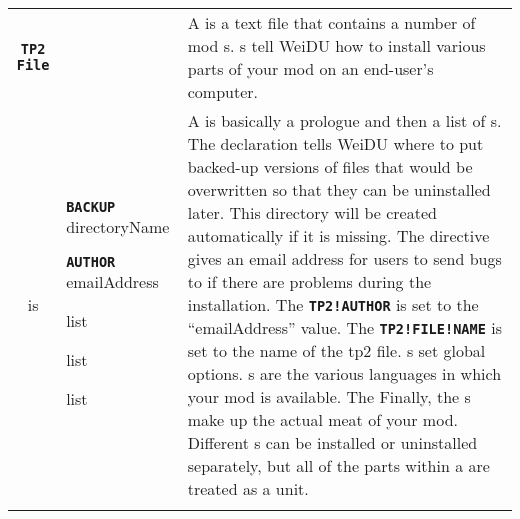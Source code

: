 \documentclass{article}
\def\ttref#1{\ahrefloc{#1}{\tt #1}}
\def\DEFINE#1{{\tt \bf #1}\label{#1}\index{#1}}
\def\Slist{{\color{red} list }}
\begin{document}
\begin{tabular}{cp{10in}|p{10in}}

\DEFINE{TP2 File} & &
  A \ttref{TP2 File} is a text file that contains a number of
  mod \ttref{Component}s. \ttref{TP2 File}s tell WeiDU how to install
  various parts of your mod on an end-user's computer. \\

  is & \DEFINE{BACKUP} directoryName

       \DEFINE{AUTHOR} emailAddress

       \ttref{TP2 Flag} \Slist

       \ttref{Language} \Slist

       \ttref{Component} \Slist &

       A \ttref{TP2 File} is basically a prologue and then a list of
       \ttref{Component}s. The \ttref{BACKUP} declaration tells WeiDU where
       to put backed-up versions of files that would be overwritten so that
       they can be uninstalled later. This directory will be created
       automatically if it is missing. The \ttref{AUTHOR} directive gives an
       email address for users to send bugs to if there are problems during
       the installation. The \DEFINE{TP2!AUTHOR} \ttref{variable} is set to
       the ``emailAddress'' value. The \DEFINE{TP2!FILE!NAME} \ttref{variable}
	   is set to the name of the tp2 file.
       \ttref{TP2 Flag}s set global options.
       \ttref{Language}s are
       the various languages in which your mod is available. The
       Finally, the \ttref{Component}s make up the actual meat of
       your mod. Different \ttref{Component}s can be installed or
       uninstalled separately, but all of the parts within a
       \ttref{Component} are treated as a unit.  \\
\\


\end{tabular}
\end{document}
